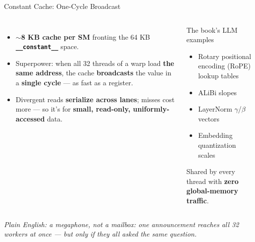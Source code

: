 \documentclass[aspectratio=169]{beamer}
\newcommand{\kw}[1]{\textbf{\textcolor{kwblue}{#1}}}
\newcommand{\pe}[1]{\par{\setlength{\fboxsep}{2.5pt}\noindent\colorbox{navy!9}{\parbox{\dimexpr\textwidth-5pt\relax}{\footnotesize\itshape Plain English: #1}}}}
\begin{document}
\begin{frame}{Constant Cache: One-Cycle Broadcast}
  \begin{columns}[t]
    \begin{itemize}
      \item $\sim$\kw{8 KB cache per SM} fronting the 64 KB \kw{\texttt{\_\_constant\_\_}} space.
      \item Superpower: when all 32 threads of a warp load \kw{the same address},
            the cache \kw{broadcasts} the value in a \kw{single cycle} --- as fast as a register.
      \item Divergent reads \kw{serialize across lanes}; misses cost more --- so it's for
            \kw{small, read-only, uniformly-accessed} data.
    \end{itemize}
    \begin{exampleblock}{The book's LLM examples}
      \begin{itemize}\small
        \item Rotary positional encoding (RoPE) lookup tables
        \item ALiBi slopes
        \item LayerNorm $\gamma$/$\beta$ vectors
        \item Embedding quantization scales
      \end{itemize}
      \smallskip
      {\small Shared by every thread with \kw{zero global-memory traffic}.}
    \end{exampleblock}
  \end{columns}
  \pe{a megaphone, not a mailbox: one announcement reaches all 32 workers at once --- but only if they all asked the same question.}
\end{frame}
\end{document}
